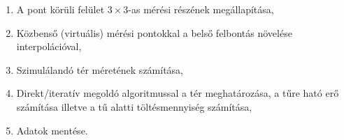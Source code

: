 	\begin{enumerate}
		\item A pont körüli felület $3\times3$-as mérési részének megállapítása,
		\item Közbenső (virtuális) mérési pontokkal a belső felbontás növelése
		interpolációval,
		\item Szimulálandó tér méretének számítása,
		\item Direkt/iteratív megoldó algoritmussal a tér meghatározása, 
				a tűre ható erő számítása illetve a tű alatti töltésmennyiség számítása,
		\item Adatok mentése.
	\end{enumerate}
	


	
